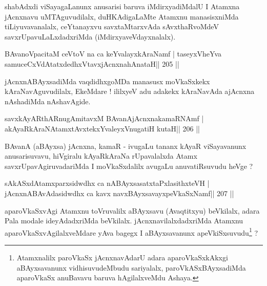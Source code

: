 \begin{artha}
shabAdxdi viSayagaLanunx anusarisi baruva iMdirxyadiMdalU I Atamxna jAcnxnavu uMTAguvudilalx, duHKAdigaLaMte Atamxnu manasisxniMda tiLiyuvavanalalx, ceYtanayxvu savxtaMtarxvAda sAvxthaRvoMdeV savxrUpavuLaLxdadxriMda (iMdirxyaveVdayxnalalx).
\end{artha}


\begin{shl}
BAvanoVpacitaM ceVtoV na ca keYvalayxkAraNamf |
taseyxVheYva samuceCxVdAtatxdedhxVtavxjAcnxnahAnataH\hfill || 205 ||
\end{shl}

\begin{artha}
jAcnxnABAyxsadiMda vaqdidhxgoMDa manasusx moVkaSxkekx kAraNavAguvudilalx, \-EkeMdare ! ililxyeV adu adakekx kAraNavAda ajAcnxna nAshadiMda nAshavAgide.
\end{artha}

\begin{shl}
savxkAyARthARnugAmitavxM BAvanAjAcnxnakamaRNAmf |
akAyaRkAraNAtamxtAvxtekxYvaleyxV\s nugatiH kutaH\hfill || 206 ||
\end{shl}

\begin{artha}
BAvanA (aBAyxsa) jAcnxna, kamaR - ivugaLu tananx kAyaR viSayavanunx anu\-sarisuvavu, hiVgiralu kAyaRkAraNa rUpavalalxda Atamx savxrUpavAgiruvadariMda I moVkaSxdalilx avugaLu anuvatiRsuvudu heVge ?
\end{artha}

\begin{shl}
sAkASxdAtamxparxsidwdhx ca nABAyxsasatxtaPxlasithxteVH |
jAcnxnABAvAdasidwdhx ca kavx navxBAyxsavayxpeVkaSxNamf\hfill || 207 ||
\end{shl}

\begin{artha}
aparoVkaSxvAgi Atamxnu toVruvalilx aBAyxsavu (Avaqtitxyu) beVkilalx, adara Pala modale ideyAdadxriMda beVkilalx. jAcnxnavilalxdadxriMda Atamxnu aparoVkaSxvAgilalxveMdare yAva bagegx I aBAyxsavanunx apeVkiSxsuvudu\footnote[1]{Atamxnalilx paroVkaSx jAcnxnavAdarU adara aparoVkaSxkAkxgi aBAyxsavanunx vidhisuvudeMbudu sariyalalx, paroVkASxBAyxsadiMda aparoVkaSx anuBavavu baruva hAgilalxveMdu Ashaya.} ?
\end{artha}


